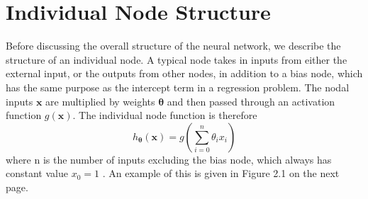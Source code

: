 \documentclass[honours,12pt]{unswthesis}
\numberwithin{equation}{section}
\theoremstyle{definition}
\begin{document}
\section{Individual Node Structure}
Before discussing the overall structure of the neural network, we describe the structure of an individual node. A typical node takes in inputs from either the external input, or the outputs from other nodes, in addition to a bias node, which has the same purpose as the intercept term in a regression problem. The nodal inputs $\bm{x}$ are multiplied by weights $\bm{\theta}$ and then passed through an activation function $g(\bm{x})$. The individual node function is therefore \[h_{\bm{\theta}}(\bm{x})=g\left(\sum\limits^n_{i=0}\theta_ix_i\right)\] where n is the number of inputs excluding the bias node, which always has constant value $x_0=1$ \citep{neuralstat}. An example of this is given in Figure 2.1 on the next page. 
\end{document}
